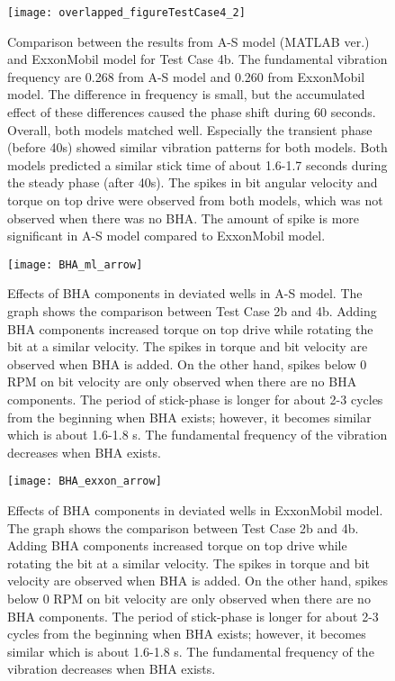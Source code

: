 \begin{figure}
  \centering
  \texttt{[image: overlapped\_figureTestCase4\_2]}
  \caption[Comparison of the results for Test Case 4b]{Comparison between the results from A-S model (MATLAB ver.) and ExxonMobil model for Test Case 4b. The fundamental vibration frequency are 0.268 from A-S model and 0.260 from ExxonMobil model. The difference in frequency is small, but the accumulated effect of these differences caused the phase shift during 60 seconds. Overall, both models matched well. Especially the transient phase (before 40s) showed similar vibration patterns for both models. Both models predicted a similar stick time of about 1.6-1.7 seconds during the steady phase (after 40s). The spikes in bit angular velocity and torque on top drive were observed from both models, which was not observed when there was no BHA. The amount of spike is more significant in A-S model compared to ExxonMobil model.}\label{figure_testcase4_2_overlapped}
\end{figure}

\begin{figure}
  \centering
  \texttt{[image: BHA\_ml\_arrow]}
  \caption[Effects of BHA components (MATLAB model)]{Effects of BHA components in deviated wells in A-S model. The graph shows the comparison between Test Case 2b and 4b. Adding BHA components increased torque on top drive while rotating the bit at a similar velocity. The spikes in torque and bit velocity are observed when BHA is added. On the other hand, spikes below 0 RPM on bit velocity are only observed when there are no BHA components. The period of stick-phase is longer for about 2-3 cycles from the beginning when BHA exists; however, it becomes similar which is about 1.6-1.8 s. The fundamental frequency of the vibration decreases when BHA exists.}\label{figure_BHA_MATLAB}
\end{figure}

\begin{figure}
  \centering
  \texttt{[image: BHA\_exxon\_arrow]}
  \caption[Effects of BHA components (ExxonMobil model)]{Effects of BHA components in deviated wells in ExxonMobil model. The graph shows the comparison between Test Case 2b and 4b. Adding BHA components increased torque on top drive while rotating the bit at a similar velocity. The spikes in torque and bit velocity are observed when BHA is added. On the other hand, spikes below 0 RPM on bit velocity are only observed when there are no BHA components. The period of stick-phase is longer for about 2-3 cycles from the beginning when BHA exists; however, it becomes similar which is about 1.6-1.8 s. The fundamental frequency of the vibration decreases when BHA exists.}\label{figure_BHA_EXXON}
\end{figure}



